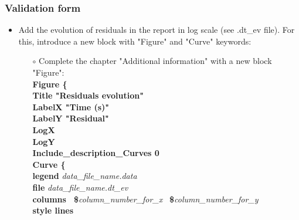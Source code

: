 \documentclass[10pt, hyperref={unicode=true,pdfusetitle, bookmarks=true,bookmarksnumbered=false,bookmarksopen=false, breaklinks=false,pdfborder={0 0 1},backref=true,colorlinks=true,linkcolor=darkblue,pageanchor}]{beamer}
\begin{document}
\begin{frame}
\frametitle{Validation form}
\begin{block}{}

\begin{itemize}
\item Add the evolution of residuals in the report in log scale (see .dt\_ev file). For this, introduce a new block with "Figure" and "Curve" keywords:
    \begin{itemize}
    \item [$\circ$] Complete the chapter "Additional information" with a new block "Figure":\\
    {\scriptsize{
    \hspace{.3cm} \textbf{Figure \{}  \\
    \hspace{.6cm} \textbf{Title "Residuals evolution"}  \\
    \hspace{.6cm} \textbf{LabelX "Time (s)"}  \\
    \hspace{.6cm} \textbf{LabelY "Residual"}  \\
    \hspace{.6cm} \textbf{LogX}  \\
    \hspace{.6cm} \textbf{LogY}  \\
    \hspace{.6cm} \textbf{Include\_description\_Curves 0}  \\
    \hspace{.6cm} \textbf{Curve \{ }  \\
    \hspace{.8cm} \textbf{legend} \textit{data\_file\_name.data}  \\
    \hspace{.8cm} \textbf{file} \textit{data\_file\_name.dt\_ev} \\
    \hspace{.8cm} \textbf{columns \, \$}\textit{column\_number\_for\_x} \, \textbf{\$}\textit{column\_number\_for\_y }  \\
    \hspace{.8cm} \textbf{style lines} \\
}}
\end{itemize}
\end{itemize}
\end{block}
\end{frame}
\end{document}
